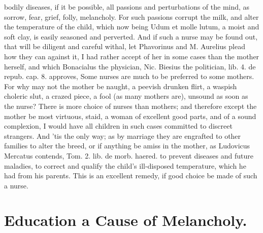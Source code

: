 {bodily diseases, if it be possible, all passions and perturbations of
the mind, as sorrow, fear, grief, folly, melancholy. For such
passions corrupt the milk, and alter the temperature of the child,
which now being  Udum et molle lutum, a moist and soft clay, is
easily seasoned and perverted. And if such a nurse may be found out,
that will be diligent and careful withal, let Phavorinus and M.
Aurelius plead how they can against it, I had rather accept of her in
some cases than the mother herself, and which Bonacialus the physician,
Nic. Biesius the politician, lib. 4. de repub. cap. 8. approves,
Some nurses are much to be preferred to some mothers. For why may
not the mother be naught, a peevish drunken flirt, a waspish choleric
slut, a crazed piece, a fool (as many mothers are), unsound as soon as
the nurse? There is more choice of nurses than mothers; and therefore
except the mother be most virtuous, staid, a woman of excellent good
parts, and of a sound complexion, I would have all children in such
cases committed to discreet strangers. And 'tis the only way; as by
marriage they are engrafted to other families to alter the breed, or if
anything be amiss in the mother, as Ludovicus Mercatus contends, Tom.
2. lib. de morb. haered. to prevent diseases and future maladies, to
correct and qualify the child's ill-disposed temperature, which he had
from his parents. This is an excellent remedy, if good choice be made
of such a nurse.

\section{Education a Cause of Melancholy.}

}

